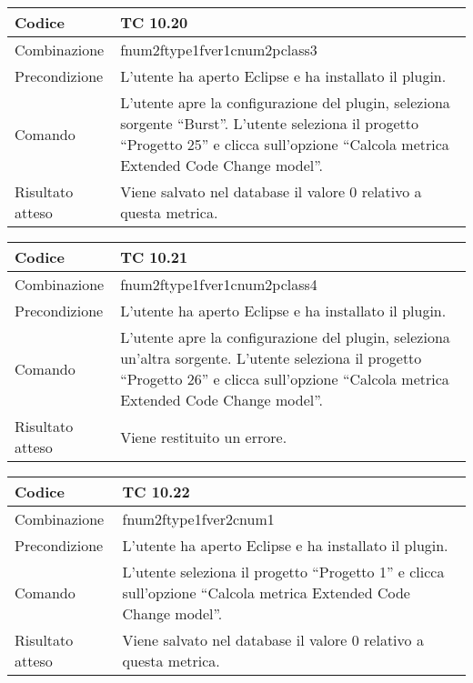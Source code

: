 \begin{table}[ht]
\begin{tabular}{|p{3cm}|p{9cm}|}
\hline
\cellcolor{lightgray}Codice				& TC 10.20								\\
\hline
\cellcolor{lightgray}Combinazione		& fnum2ftype1fver1cnum2pclass3									\\
\hline
\cellcolor{lightgray}Precondizione		& L'utente ha aperto Eclipse e ha installato il plugin.		\\
\hline
\cellcolor{lightgray}Comando			& L'utente apre la configurazione del plugin, seleziona sorgente ``Burst''. L'utente seleziona il progetto ``Progetto 25''  e clicca sull'opzione ``Calcola metrica Extended Code Change model''.	\\
\hline
\cellcolor{lightgray}Risultato atteso	& Viene salvato nel database il valore 0 relativo a questa metrica.\\
\hline
\end{tabular}
\end{table}

\begin{table}[ht]
\begin{tabular}{|p{3cm}|p{9cm}|}
\hline
\cellcolor{lightgray}Codice				& TC 10.21								\\
\hline
\cellcolor{lightgray}Combinazione		& fnum2ftype1fver1cnum2pclass4									\\
\hline
\cellcolor{lightgray}Precondizione		& L'utente ha aperto Eclipse e ha installato il plugin.		\\
\hline
\cellcolor{lightgray}Comando			& L'utente apre la configurazione del plugin, seleziona un'altra sorgente. L'utente seleziona il progetto ``Progetto 26''  e clicca sull'opzione ``Calcola metrica Extended Code Change model''.	\\
\hline
\cellcolor{lightgray}Risultato atteso	& Viene restituito un errore.\\
\hline
\end{tabular}
\end{table}

\begin{table}[ht]
\begin{tabular}{|p{3cm}|p{9cm}|}
\hline
\cellcolor{lightgray}Codice				& TC 10.22								\\
\hline
\cellcolor{lightgray}Combinazione		& fnum2ftype1fver2cnum1									\\
\hline
\cellcolor{lightgray}Precondizione		& L'utente ha aperto Eclipse e ha installato il plugin.		\\
\hline
\cellcolor{lightgray}Comando			& L'utente seleziona il progetto ``Progetto 1''  e clicca sull'opzione ``Calcola metrica Extended Code Change model''.	\\
\hline
\cellcolor{lightgray}Risultato atteso	& Viene salvato nel database il valore 0 relativo a questa metrica.\\
\hline
\end{tabular}
\end{table}

